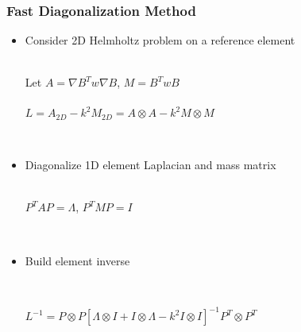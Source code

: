 \documentclass{beamer}
\begin{document}
\begin{frame}
\begin{center}
\frametitle{Fast Diagonalization Method}

\begin{itemize}

\item Consider 2D Helmholtz problem on a reference element\\

\begin{center}

~\\

Let $A = \nabla B^T w \nabla B$, $M = B^T w B$\\

~\\

$L = A_{2D} - k^2 M_{2D} = A \otimes A - k^2 M \otimes M$

\end{center}

~\\

\item Diagonalize 1D element Laplacian and mass matrix\\

~\\

\begin{center}

$P^T A P = \Lambda$, $P^T M P = I$

\end{center}

~\\

\item Build element inverse

~\\

\begin{center}

$L^{-1} = P \otimes P \left[ \Lambda \otimes I + I \otimes \Lambda - k^2 I \otimes I \right]^{-1} P^T \otimes P^T$

\end{center}

~\\

\end{itemize}

\end{center}
\end{frame}
\end{document}
